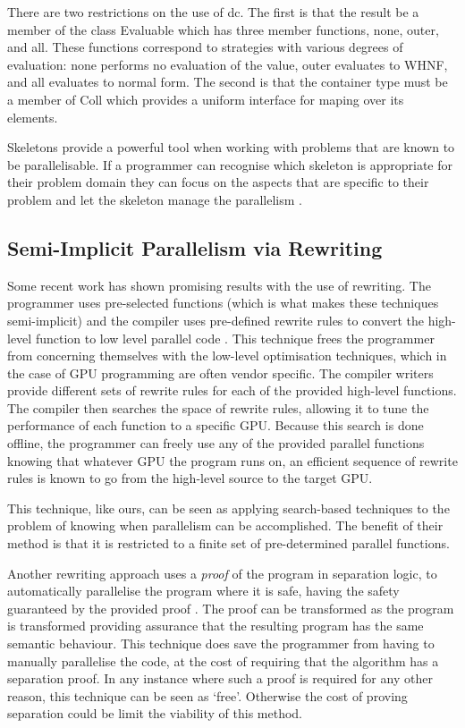 There are two restrictions on the use of \<dc\>. The first is that the result be a member of
the class \<Evaluable\> which has three member functions, \<none\>, \<outer\>,
and \<all\>. These functions correspond to strategies with various degrees of
evaluation: \<none\> performs no evaluation of the value, \<outer\> evaluates
to WHNF, and \<all\> evaluates to normal form. The second is that the container type
must be a member of \<Coll\> which provides a uniform interface for \<map\>ing
over its elements.

Skeletons provide a powerful tool when working with problems that are known to
be parallelisable. If a programmer can recognise which skeleton is appropriate
for their problem domain they can focus on the aspects that are specific to
their problem and let the skeleton manage the parallelism \citep{skeletons}.


\subsection{Semi-Implicit Parallelism via Rewriting}


Some recent work has shown promising results with the use of rewriting. The
programmer uses pre-selected functions (which is what makes these techniques
semi-implicit) and the compiler uses pre-defined rewrite rules to convert the
high-level function to low level parallel code \citep{SteuwerPortable}. This
technique frees the programmer from concerning themselves with the low-level
optimisation techniques, which in the case of GPU programming are often vendor
specific. The compiler writers provide different sets of rewrite rules for each
of the provided high-level functions. The compiler then searches the space of
rewrite rules, allowing it to tune the performance of each function to a
specific GPU. Because this search is done offline, the programmer can freely
use any of the provided parallel functions knowing that whatever GPU the
program runs on, an efficient sequence of rewrite rules is known to go from the
high-level source to the target GPU.

This technique, like ours, can be seen as applying search-based techniques to
the problem of knowing when parallelism can be accomplished. The benefit of
their method is that it is restricted to a finite set of pre-determined
parallel functions.

Another rewriting approach uses a \emph{proof} of the program in separation
logic, to automatically parallelise the program where it is safe, having the
safety guaranteed by the provided proof \citep{hurlinProof}. The proof can be
transformed as the program is transformed providing assurance that the
resulting program has the same semantic behaviour. This technique does save the
programmer from having to manually parallelise the code, at the cost of
requiring that the algorithm has a separation proof. In any instance where such
a proof is required for any other reason, this technique can be seen as `free'.
Otherwise the cost of proving separation could be limit the viability of this
method.


